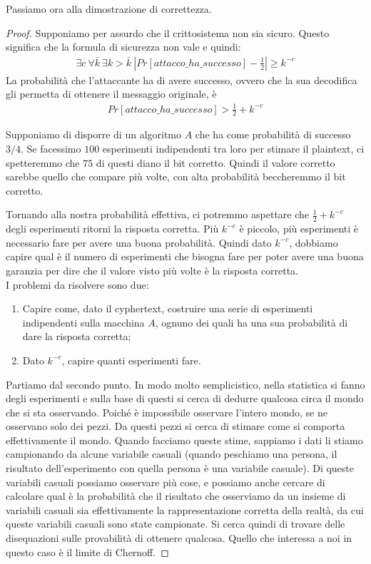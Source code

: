 \noindent Passiamo ora alla dimostrazione di correttezza.\\
\begin{proof}
Supponiamo per assurdo che il crittosistema non sia sicuro. Questo significa che la formula di sicurezza non vale e quindi:
\begin{align*}
    \exists c \ \forall \bar{k} \ \exists k > \bar{k} \ \left|Pr[attacco\_ha\_successo] - \frac{1}{2}\right| \ge k^{-c}
\end{align*}
La probabilità che l'attaccante ha di avere successo, ovvero che la sua decodifica gli permetta di ottenere il messaggio originale, è
\begin{align*}
    Pr[attacco\_ha\_successo] > \frac{1}{2} + k ^{-c}
\end{align*}

Supponiamo di disporre di un algoritmo $A$ che ha come probabilità di successo $3/4$. 
Se facessimo $100$ esperimenti indipendenti tra loro per stimare il plaintext, ci spetteremmo che $75$ di questi diano il bit corretto. Quindi il valore corretto sarebbe quello che compare più volte, con alta probabilità beccheremmo il bit corretto.

Tornando alla nostra probabilità effettiva, ci potremmo aspettare che $\frac{1}{2} + k^{-c}$ degli esperimenti ritorni la risposta corretta. Più $k^{-c}$ è piccolo, più esperimenti è necessario fare per avere una buona probabilità. Quindi dato $k^{-c}$, dobbiamo capire qual è il numero di esperimenti che bisogna fare per poter avere una buona garanzia per dire che il valore visto più volte è la risposta corretta. \\

\noindent I problemi da risolvere sono due:
\begin{enumerate}
    \item Capire come, dato il cyphertext, costruire una serie di esperimenti indipendenti sulla macchina $A$, ognuno dei quali ha una sua probabilità di dare la risposta corretta;
    \item Dato $k^{-c}$, capire quanti esperimenti fare.
\end{enumerate}

\noindent Partiamo dal secondo punto. In modo molto semplicistico, nella statistica si fanno degli esperimenti e sulla base di questi si cerca di dedurre qualcosa circa il mondo che si sta osservando. Poiché è impossibile osservare l'intero mondo, se ne osservano solo dei pezzi. Da questi pezzi si cerca di stimare come si comporta effettivamente il mondo. Quando facciamo queste stime, sappiamo i dati li stiamo campionando da alcune variabile casuali (quando peschiamo una persona, il risultato dell'esperimento con quella persona è una variabile casuale). Di queste variabili casuali possiamo osservare più cose, e possiamo anche cercare di calcolare qual è la probabilità che il risultato che osserviamo da un insieme di variabili casuali sia effettivamente la rappresentazione corretta della realtà, da cui queste variabili casuali sono state campionate. Si cerca quindi di trovare delle disequazioni sulle provabilità di ottenere qualcosa. Quello che interessa a noi in questo caso è il limite di Chernoff.


\end{proof}
